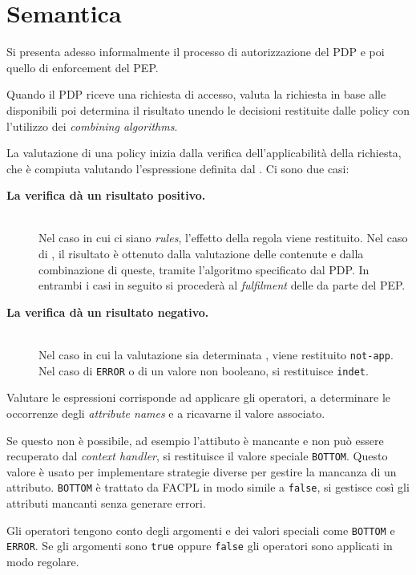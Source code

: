\section{Semantica}
\label{sec:sem_fpl}
Si presenta adesso informalmente il processo di autorizzazione del \ac{PDP} e poi quello di enforcement del \ac{PEP}.\par
Quando il \ac{PDP} riceve una richiesta di accesso, valuta la richiesta in base alle \epolicy disponibili poi determina
il risultato unendo le decisioni restituite dalle policy con l'utilizzo dei \emph{combining algorithms}.\par
La valutazione di una policy inizia dalla verifica dell'applicabilità della richiesta, che è compiuta valutando
l'espressione definita dal \etarget. Ci sono due casi:
\begin{description}
  \item[\normalfont\bfseries{\MakeUppercase{L}a verifica dà un risultato positivo.}] \hfill \\
        Nel caso in cui ci siano \emph{rules}, l'effetto della regola viene restituito.
        Nel caso di \ePolicySet, il risultato è ottenuto dalla valutazione delle \epolicy contenute e dalla combinazione di queste,
        tramite l'algoritmo specificato dal \ac{PDP}. In entrambi i casi in seguito si procederà al \emph{fulfilment} delle
        \eobligation da parte del \ac{PEP}.
  \item[\normalfont\bfseries{\MakeUppercase{L}a verifica dà un risultato negativo.}] \hfill \\
        Nel caso in cui la valutazione sia determinata \efalse, viene restituito
        \texttt{not-app}. Nel caso di \texttt{ERROR} o di un valore non booleano, si restituisce \texttt{indet}.
\end{description}
Valutare le espressioni corrisponde ad applicare gli operatori, a determinare le occorrenze degli \emph{attribute names} e
a ricavarne il valore associato.\par
Se questo non è possibile, ad esempio l'attibuto è mancante e non può essere recuperato dal \emph{context handler}, si
restituisce il valore speciale \texttt{BOTTOM}. Questo valore è usato per implementare strategie diverse per gestire
la mancanza di un attributo. \texttt{BOTTOM} è trattato da \ac{FACPL} in modo simile a \texttt{false}, si gestisce
così gli attributi mancanti senza generare errori.\par
Gli operatori tengono conto degli argomenti e dei valori speciali come \texttt{BOTTOM} e \texttt{ERROR}.
Se gli argomenti sono \texttt{true} oppure \texttt{false} gli operatori sono applicati in modo regolare.

